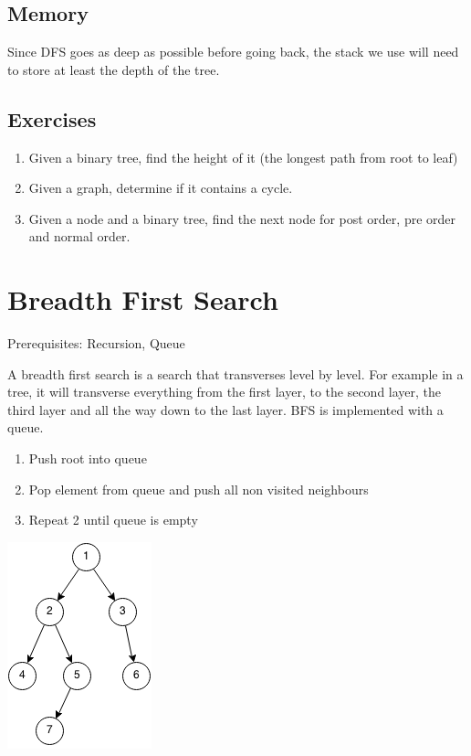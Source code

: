 \documentclass[11pt,oneside]{book}
\makeatletter
\def\maxwidth#1{\ifdim\Gin@nat@width>#1 #1\else\Gin@nat@width\fi}
\makeatother
\begin{document}
\subsection{Memory}

Since DFS goes as deep as possible before going back, the stack we use will need to store at least the depth of the tree.

\subsection{Exercises}

\begin{enumerate}
\item Given a binary tree, find the height of it (the longest path from root to leaf)
\item Given a graph, determine if it contains a cycle.
\item Given a node and a binary tree, find the next node for post order, pre order and normal order.
\end{enumerate}
\section{Breadth First Search}

Prerequisites: Recursion, Queue

A breadth first search is a search that transverses level by level. For example in a tree, it will transverse everything from the first layer, to the second layer, the third layer and all the way down to the last layer. BFS is implemented with a queue.

\begin{enumerate}
\item Push root into queue
\item Pop element from queue and push all non visited neighbours
\item Repeat 2 until queue is empty
\end{enumerate}

\includegraphics[width=\maxwidth{\textwidth}]{bfs.png}
\end{document}
